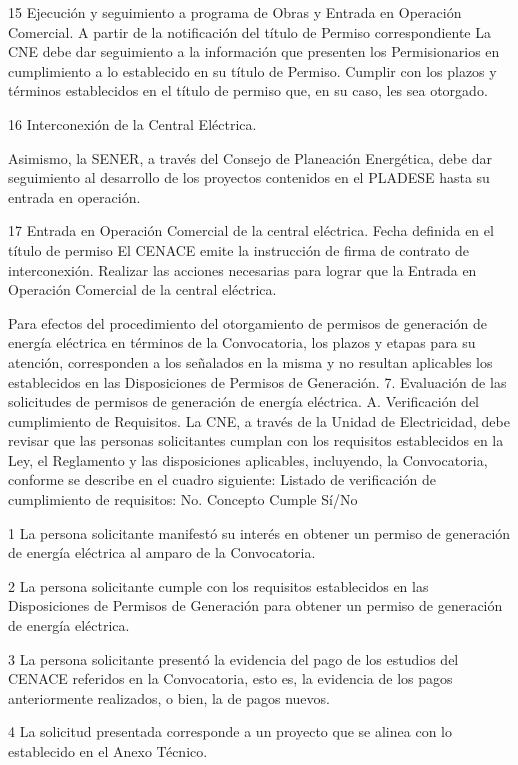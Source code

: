  15
 Ejecución y seguimiento a programa de Obras y Entrada en Operación Comercial.
 A partir de la notificación del título de Permiso correspondiente
 La CNE debe dar seguimiento a la información que presenten los Permisionarios en cumplimiento a lo establecido en su título de Permiso.
 Cumplir con los plazos y términos establecidos en el título de permiso que, en su caso, les sea otorgado.
 
 16
 Interconexión de la Central Eléctrica.
 
 Asimismo, la SENER, a través del Consejo de Planeación Energética, debe dar seguimiento al desarrollo de los proyectos contenidos en el PLADESE hasta su entrada en operación.
 
 
 17
 Entrada en Operación Comercial de la central eléctrica.
 Fecha definida en el título de permiso
 El CENACE emite la instrucción de firma de contrato de interconexión.
 Realizar las acciones necesarias para lograr que la Entrada en Operación Comercial de la central eléctrica.
 
 
Para efectos del procedimiento del otorgamiento de permisos de generación de energía eléctrica en términos de la Convocatoria, los plazos y etapas para su atención, corresponden a los señalados en la misma y no resultan aplicables los establecidos en las Disposiciones de Permisos de Generación.
7. Evaluación de las solicitudes de permisos de generación de energía eléctrica.
A. Verificación del cumplimiento de Requisitos.
La CNE, a través de la Unidad de Electricidad, debe revisar que las personas solicitantes cumplan con los requisitos establecidos en la Ley, el Reglamento y las disposiciones aplicables, incluyendo, la Convocatoria, conforme se describe en el cuadro siguiente:
Listado de verificación de cumplimiento de requisitos:
No.
 Concepto
 Cumple
Sí/No
 
 1
 La persona solicitante manifestó su interés en obtener un permiso de generación de energía eléctrica al amparo de la Convocatoria.
 
 
 2
 La persona solicitante cumple con los requisitos establecidos en las Disposiciones de Permisos de Generación para obtener un permiso de generación de energía eléctrica.
 
 
 3
 La persona solicitante presentó la evidencia del pago de los estudios del CENACE referidos en la Convocatoria, esto es, la evidencia de los pagos anteriormente realizados, o bien, la de pagos nuevos.
 
 
 4
 La solicitud presentada corresponde a un proyecto que se alinea con lo establecido en el Anexo Técnico.
 
